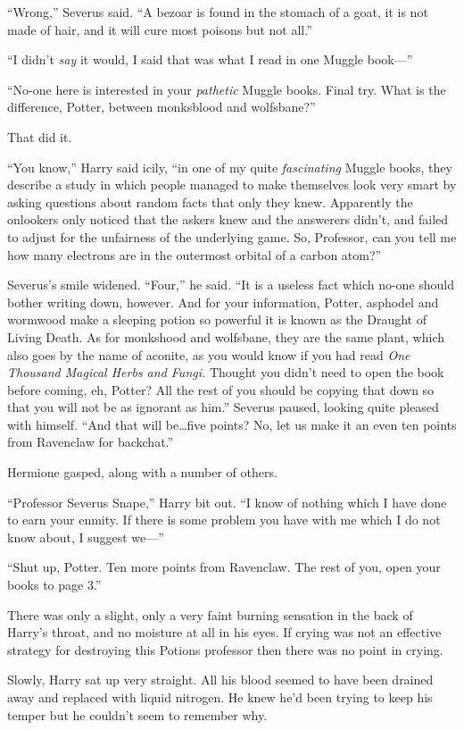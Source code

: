 “Wrong,” Severus said. “A bezoar is found in the stomach of a goat, it is not made of hair, and it will cure most poisons but not all.”

“I didn’t \emph{say} it would, I said that was what I read in one Muggle book—”

“No-one here is interested in your \emph{pathetic} Muggle books. Final try. What is the difference, Potter, between monksblood and wolfsbane?”

That did it.

“You know,” Harry said icily, “in one of my quite \emph{fascinating} Muggle books, they describe a study in which people managed to make themselves look very smart by asking questions about random facts that only they knew. Apparently the onlookers only noticed that the askers knew and the answerers didn’t, and failed to adjust for the unfairness of the underlying game. So, Professor, can you tell me how many electrons are in the outermost orbital of a carbon atom?”

Severus’s smile widened. “Four,” he said. “It is a useless fact which no-one should bother writing down, however. And for your information, Potter, asphodel and wormwood make a sleeping potion so powerful it is known as the Draught of Living Death. As for monkshood and wolfsbane, they are the same plant, which also goes by the name of aconite, as you would know if you had read \emph{One Thousand Magical Herbs and Fungi.} Thought you didn’t need to open the book before coming, eh, Potter? All the rest of you should be copying that down so that you will not be as ignorant as him.” Severus paused, looking quite pleased with himself. “And that will be…five points? No, let us make it an even ten points from Ravenclaw for backchat.”

Hermione gasped, along with a number of others.

“Professor Severus Snape,” Harry bit out. “I know of nothing which I have done to earn your enmity. If there is some problem you have with me which I do not know about, I suggest we—”

“Shut up, Potter. Ten more points from Ravenclaw. The rest of you, open your books to page 3.”

There was only a slight, only a very faint burning sensation in the back of Harry’s throat, and no moisture at all in his eyes. If crying was not an effective strategy for destroying this Potions professor then there was no point in crying.

Slowly, Harry sat up very straight. All his blood seemed to have been drained away and replaced with liquid nitrogen. He knew he’d been trying to keep his temper but he couldn’t seem to remember why.

